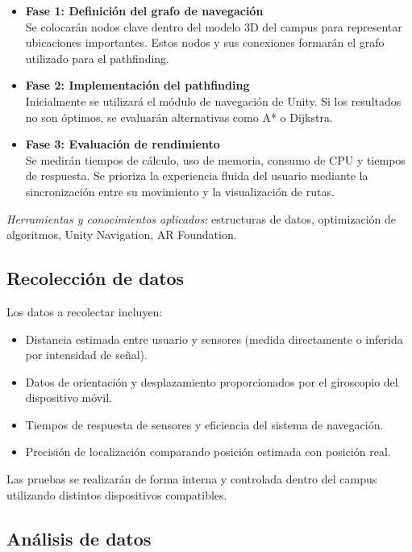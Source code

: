 \documentclass{article}
\begin{document}
\begin{itemize}
    \item \textbf{Fase 1: Definición del grafo de navegación} \\
    Se colocarán nodos clave dentro del modelo 3D del campus para representar ubicaciones importantes. Estos nodos y sus conexiones formarán el grafo utilizado para el pathfinding.

    \item \textbf{Fase 2: Implementación del pathfinding} \\
    Inicialmente se utilizará el módulo de navegación de Unity. Si los resultados no son óptimos, se evaluarán alternativas como A* o Dijkstra.

    \item \textbf{Fase 3: Evaluación de rendimiento} \\
    Se medirán tiempos de cálculo, uso de memoria, consumo de CPU y tiempos de respuesta. Se prioriza la experiencia fluida del usuario mediante la sincronización entre su movimiento y la visualización de rutas.
\end{itemize}

\textit{Herramientas y conocimientos aplicados:} estructuras de datos, optimización de algoritmos, Unity Navigation, AR Foundation.

\subsection{Recolección de datos}

Los datos a recolectar incluyen:

\begin{itemize}
    \item Distancia estimada entre usuario y sensores (medida directamente o inferida por intensidad de señal).
    \item Datos de orientación y desplazamiento proporcionados por el giroscopio del dispositivo móvil.
    \item Tiempos de respuesta de sensores y eficiencia del sistema de navegación.
    \item Precisión de localización comparando posición estimada con posición real.
\end{itemize}

Las pruebas se realizarán de forma interna y controlada dentro del campus utilizando distintos dispositivos compatibles.

\subsection{Análisis de datos}
\end{document}
